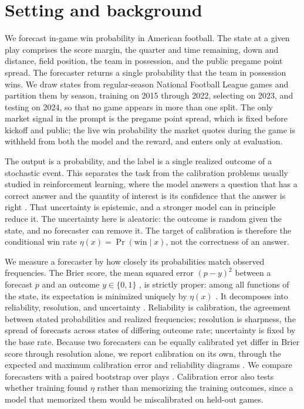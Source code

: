 \section{Setting and background}
\label{sec:setting}

We forecast in-game win probability in American football. The state at a given play comprises the score
margin, the quarter and time remaining, down and distance, field position, the team in possession, and
the public pregame point spread. The forecaster returns a single probability that the team in possession
wins. We draw states from regular-season National Football League games and partition them by season,
training on 2015 through 2022, selecting on 2023, and testing on 2024, so that no game appears in more
than one split.
The only market signal in the prompt is the pregame point spread, which is fixed before kickoff and
public; the live win probability the market quotes during the game is withheld from both the model and
the reward, and enters only at evaluation.

The output is a probability, and the label is a single realized outcome of a stochastic event. This
separates the task from the calibration problems usually studied in reinforcement learning, where the
model answers a question that has a correct answer and the quantity of interest is its confidence that
the answer is right \citep{rlcr, dcpo}. That uncertainty is epistemic, and a stronger model can in
principle reduce it. The uncertainty here is aleatoric: the outcome is random given the state, and no
forecaster can remove it. The target of calibration is therefore the conditional win rate
$\eta(x)=\Pr(\text{win}\mid x)$, not the correctness of an answer.

We measure a forecaster by how closely its probabilities match observed frequencies. The Brier score,
the mean squared error $(p-y)^2$ between a forecast $p$ and an outcome $y\in\{0,1\}$ \citep{brier1950},
is strictly proper: among all functions of the state, its expectation is minimized uniquely by $\eta(x)$
\citep{gneiting2007}. It decomposes into reliability, resolution, and uncertainty \citep{murphy1973}.
Reliability is calibration, the agreement between stated probabilities and realized frequencies;
resolution is sharpness, the spread of forecasts across states of differing outcome rate; uncertainty is
fixed by the base rate. Because two forecasters can be equally calibrated yet differ in Brier score
through resolution alone, we report calibration on its own, through the expected and maximum calibration
error and reliability diagrams \citep{guo2017, brocker2007, dimitriadis2021}. We compare forecasters with
a paired bootstrap over plays \citep{efron1979}. Calibration error also tests whether training found
$\eta$ rather than memorizing the training outcomes, since a model that memorized them would be
miscalibrated on held-out games.

